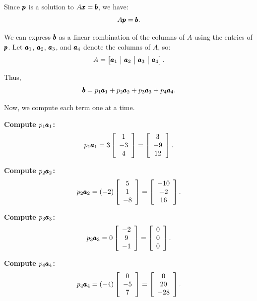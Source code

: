 \begin{solution} Since $\pmb{p}$ is a solution to $A \pmb{x} = \pmb{b}$, we have:
    \[
    A \pmb{p} = \pmb{b}.
    \]
    
    We can express $\pmb{b}$ as a linear combination of the columns of $A$ using the entries of $\pmb{p}$. Let $\pmb{a}_1$, $\pmb{a}_2$, $\pmb{a}_3$, and $\pmb{a}_4$ denote the columns of $A$, so:
    \[
    A = \left[ \vect{a}_1 \ \big| \ \vect{a}_2 \ \big| \ \vect{a}_3 \ \big| \ \vect{a}_4 \right].
    \]
    
    Thus,
    \[
    \pmb{b} = p_1 \pmb{a}_1 + p_2 \pmb{a}_2 + p_3 \pmb{a}_3 + p_4 \pmb{a}_4.
    \]
    
    Now, we compute each term one at a time.
    
    \textbf{Compute $p_1 \pmb{a}_1$:}
    \[
    p_1 \pmb{a}_1 = 3 \left[\begin{array}{c}
    1 \\
    -3 \\
    4
    \end{array}\right] = \left[\begin{array}{c}
    3 \\
    -9 \\
    12
    \end{array}\right].
    \]
    
    \textbf{Compute $p_2 \pmb{a}_2$:}
    \[
    p_2 \pmb{a}_2 = (-2) \left[\begin{array}{c}
    5 \\
    1 \\
    -8
    \end{array}\right] = \left[\begin{array}{c}
    -10 \\
    -2 \\
    16
    \end{array}\right].
    \]
    
    \textbf{Compute $p_3 \pmb{a}_3$:}
    \[
    p_3 \pmb{a}_3 = 0 \left[\begin{array}{c}
    -2 \\
    9 \\
    -1
    \end{array}\right] = \left[\begin{array}{c}
    0 \\
    0 \\
    0
    \end{array}\right].
    \]
    
    \textbf{Compute $p_4 \pmb{a}_4$:}
    \[
    p_4 \pmb{a}_4 = (-4) \left[\begin{array}{c}
    0 \\
    -5 \\
    7
    \end{array}\right] = \left[\begin{array}{c}
    0 \\
    20 \\
    -28
    \end{array}\right].
    \]
    

\end{solution}
